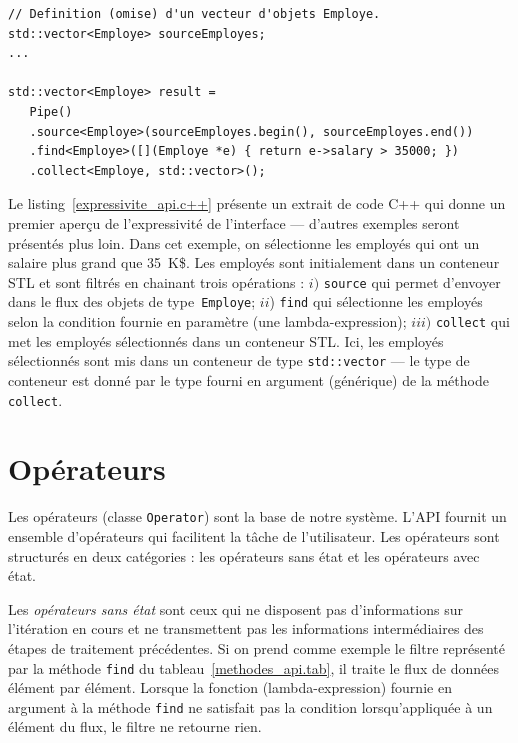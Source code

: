 
\begin{Listing}
{\small
\begin{lstlisting}
// Definition (omise) d'un vecteur d'objets Employe.
std::vector<Employe> sourceEmployes;
...

std::vector<Employe> result = 
   Pipe()
   .source<Employe>(sourceEmployes.begin(), sourceEmployes.end())
   .find<Employe>([](Employe *e) { return e->salary > 35000; })
   .collect<Employe, std::vector>();
\end{lstlisting}
}
\caption{Un exemple illustrant l'\'expressivit\'e de l'API de \ppff.}
\label{expressivite_api.c++}
\end{Listing}


Le listing~\ref{expressivite_api.c++} pr\'esente un extrait de code C++ qui donne un premier aper\c{c}u de l'expressivit\'e de l'interface --- d'autres exemples seront pr\'esent\'es plus loin. Dans cet exemple, on s\'electionne les employ\'es qui ont un salaire plus grand que 35~K\$. Les employ\'es sont initialement dans un conteneur STL et sont filtr\'es en chainant trois op\'erations : $i)$ \texttt{source} qui permet d'envoyer dans le flux des objets de type~\texttt{Employe}; $ii$) \texttt{find} qui s\'electionne les employ\'es selon la condition fournie en param\`etre (une lambda-expression); $iii)$ \texttt{collect} qui met les employ\'es s\'electionn\'es dans un conteneur STL. Ici, les employ\'es s\'electionn\'es sont mis dans un conteneur de type \texttt{std::vector} --- le type de conteneur est donn\'e par le type fourni en argument (g\'en\'erique) de la m\'ethode \texttt{collect}.




\section{Op\'erateurs}

Les op\'erateurs (classe \texttt{Operator}) sont la base de notre syst\`eme. L'API fournit un ensemble d'op\'erateurs qui facilitent la t\^ache de l'utilisateur. Les op\'erateurs sont structur\'es en deux cat\'egories : les op\'erateurs sans \'etat et les op\'erateurs avec \'etat.

Les \emph{op\'erateurs sans \'etat} sont ceux qui ne disposent pas d'informations sur l'it\'eration en cours et ne transmettent pas les informations interm\'ediaires des \'etapes de traitement pr\'ec\'edentes. Si on prend comme exemple le filtre repr\'esent\'e par la m\'ethode \texttt{find} du tableau~\ref{methodes_api.tab}, il traite le flux de donn\'ees \'el\'ement par \'el\'ement. 
%
Lorsque la fonction (lambda-expression) fournie en argument \`a la m\'ethode \texttt{find} ne satisfait pas la condition lorsqu'appliqu\'ee \`a un \'el\'ement du flux, le filtre ne retourne rien. 


